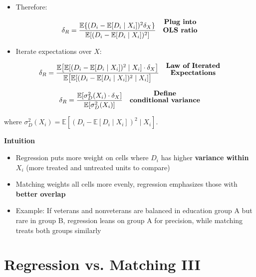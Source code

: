 \documentclass[12pt]{article}
\begin{document}
\begin{itemize}
    \item Therefore:
\end{itemize}

\singlespacing
\begin{align}
\delta_R 
   &= \frac{\mathbb{E}\{ (D_i - \mathbb{E}[D_i \mid X_i])^2 \delta_X \}}{\mathbb{E}[(D_i - \mathbb{E}[D_i \mid X_i])^2]} 
   & \text{\textbf{\shortstack{Plug into \\ OLS ratio}}}
\end{align}

\begin{itemize}
    \item Iterate expectations over $X$:
\end{itemize}

\singlespacing
\begin{align}
\delta_R 
   &= \frac{\mathbb{E}\big[ \mathbb{E}[(D_i - \mathbb{E}[D_i \mid X_i])^2 \mid X_i] \cdot \delta_X \big]}{\mathbb{E}\big[\mathbb{E}[(D_i - \mathbb{E}[D_i \mid X_i])^2 \mid X_i]\big]} 
   & \text{\textbf{\shortstack{Law of Iterated \\ Expectations}}}
\end{align}

\singlespacing
\begin{align}
\delta_R 
   &= \frac{\mathbb{E}[ \sigma_D^2(X_i) \cdot \delta_X ]}{\mathbb{E}[\sigma_D^2(X_i)]} 
   & \text{\textbf{\shortstack{Define \\ conditional variance}}}
\end{align}

where \(\sigma_D^2(X_i) = \mathbb{E}[(D_i - \mathbb{E}[D_i \mid X_i])^2 \mid X_i]\).

\textbf{Intuition}
\begin{itemize}
    \item Regression puts more weight on cells where $D_i$ has higher \textbf{variance within $X_i$} (more treated and untreated units to compare)
    \item Matching weights all cells more evenly, regression emphasizes those with \textbf{better overlap}
    \item Example: If veterans and nonveterans are balanced in education group A but rare in group B, regression leans on group A for precision, while matching treats both groups similarly
\end{itemize}

\section*{\noindent\textbf{Regression vs. Matching III}}
\end{document}
